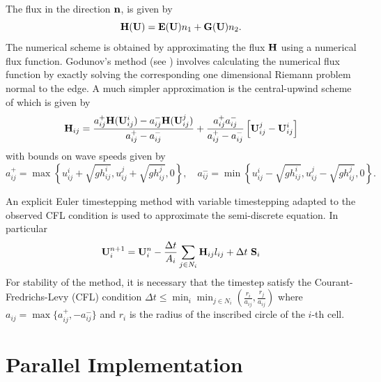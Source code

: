 \documentclass{manual}
\begin{document}
The flux in the direction $\mathbf{n}$, is given by 
\[
\mathbf{H}(\mathbf{U})  = \mathbf{E}(\mathbf{U}) n_1 + \mathbf{G}(\mathbf{U}) n_2 .
\]
The numerical scheme is obtained by approximating the flux $\mathbf{H}$ using a numerical flux function. 
Godunov's method (see \cite{Toro1992}) involves calculating the
numerical flux function by exactly
solving the corresponding one dimensional Riemann problem normal to
the edge. A much simpler approximation is the  central-upwind scheme 
of \cite{KurNP2001} which is given by
\[
\mathbf{H}_{ij} = \frac{a^+_{ij}  \mathbf{H}(\mathbf{U}^i_{ij}) - a^-_{ij}\mathbf{H}(\mathbf{U}^j_{ij}) }
{a^+_{ij} - a^-_{ij}} 
+ \frac{a^+_{ij}  a^-_{ij}} {a^+_{ij} - a^-_{ij}} \left[ \mathbf{U}^j_{ij} - \mathbf{U}^i_{ij}\right]
\]
with bounds on wave speeds given by
\[
a_{ij}^+ = \max \left\{ u_{ij}^i + \sqrt{g h_{ij}^i},  u_{ij}^j + \sqrt{g h_{ij}^j}, 0 \right\}, \quad
a_{ij}^- = \min \left\{ u_{ij}^i - \sqrt{g h_{ij}^i},  u_{ij}^j - \sqrt{g h_{ij}^j}, 0 \right\} .
\]

An explicit Euler
timestepping method with variable timestepping adapted to the
observed CFL condition is used to approximate the semi-discrete equation. In particular
\[
 \UU^{n+1}_i =  \UU^n_i -  \frac{\Delta t}{A_i}\sum\limits_{j\in N_i} \HH_{ij} l_{ij}  +  \Delta t\ \SSS_i
\]
For stability of the method, it is necessary that the timestep satisfy the Courant-Fredrichs-Levy (CFL) condition
$
  \Delta t \le \min_{i}  \min_{j\in N_i} \left( \frac{r_i}{a_{ij}}, \frac{r_j}{a_{ij}} \right )
$
where $a_{ij} = \max \{ a_{ij}^+, -a_{ij}^- \} $ and $r_i$  is the radius  of the inscribed circle of the $i$-th cell. 


\section{Parallel Implementation}
\end{document}
